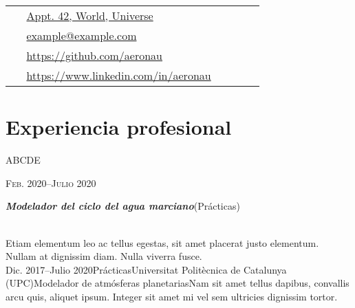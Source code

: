 \documentclass[10pt]{article} %
\newcommand{\workposition}[6]{
	\expandafter\ifstrequal\expandafter{#3}{}{}{{\raggedright #3}\hfill{\textsc{#1}}\\} %
	\expandafter\ifstrequal\expandafter{#4}{}{}{{\raggedright\large\textit{\textbf{#4}}\hfill\expandafter\ifstrequal\expandafter{#2}{}{}{{\footnotesize (#2)}}}\\[4pt]} %
	\expandafter\ifstrequal\expandafter{#5}{}{}{#5\\} %
}
\newcommand{\tableentry}[3]{
	\textsc{#1} & #2\expandafter\ifstrequal\expandafter{#3}{}{\\}{\\[3pt]} %
}
\begin{document}
\begin{paracol}{2}

 
\vspace{-0.05\textheight}
 \colorbox{shade}{
\begin{supertabular}{p{0.05\linewidth}|p{0.775\linewidth}}
\raisebox{-1pt}{\faHome}
 & \href{https://goo.gl/maps/NiMqg2mtYFxLyKfM8}{Appt. 42, World, Universe}
\\

\raisebox{0pt}{\small\faEnvelope}
 & \href{mailto:example@example.com}{example@example.com}
\\

\raisebox{-1pt}{\faGithub}
 & \href{https://github.com/aeronau}{https://github.com/aeronau}
\\

\raisebox{-1pt}{\faLinkedinSquare}
 & \href{https://www.linkedin.com/in/aeronau}{https://www.linkedin.com/in/aeronau}
\\

\end{supertabular}
}
 
\section{Experiencia profesional}
 \workposition{Feb. 2020--Julio 2020}{Prácticas}{ABCDE}{Modelador del ciclo del agua marciano}{Etiam elementum leo ac tellus egestas, sit amet placerat justo elementum. Nullam at dignissim diam. Nulla viverra fusce.}
 

 \workposition{Dic. 2017--Julio 2020}{Prácticas}{Universitat Politècnica de Catalunya (UPC)}{Modelador de atmósferas planetarias}{Nam sit amet tellus dapibus, convallis arcu quis, aliquet ipsum. Integer sit amet mi vel sem ultricies dignissim tortor.}
 


\end{paracol}
\end{document}
